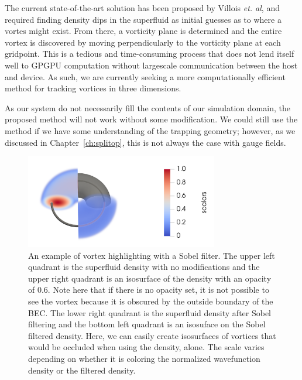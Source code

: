 The current state-of-the-art solution has been proposed by Villois \textit{et. al}, and required finding density dips in the superfluid as initial guesses as to where a vortes might exist.
From there, a vorticity plane is determined and the entire vortex is discovered by moving perpendicularly to the vorticity plane at each gridpoint.
This is a tedious and time-consuming process that does not lend itself well to GPGPU computation without largescale communication between the host and device.
As such, we are currently seeking a more computationally efficient method for tracking vortices in three dimensions.

As our system do not necessarily fill the contents of our simulation domain, the proposed method will not work without some modification.
We could still use the method if we have some understanding of the trapping geometry; however, as we discussed in Chapter~\ref{ch:splitop}, this is not always the case with gauge fields.

\begin{figure}
\center \includegraphics[width=0.75\textwidth]{data/gpu/vortex_highlighting/all.png}
\caption{
An example of vortex highlighting with a Sobel filter.
The upper left quadrant is the superfluid density with no modifications and the upper right quadrant is an isosurface of the density with an opacity of 0.6.
Note here that if there is no opacity set, it is not possible to see the vortex because it is obscured by the outside boundary of the BEC.
The lower right quadrant is the superfluid density after Sobel filtering and the bottom left quadrant is an isosuface on the Sobel filtered density.
Here, we can easily create isosurfaces of vortices that would be occluded when using the density, alone.
The scale varies depending on whether it is coloring the normalized wavefunction density or the filtered density.
}
\label{fig:highlight}
\end{figure}

